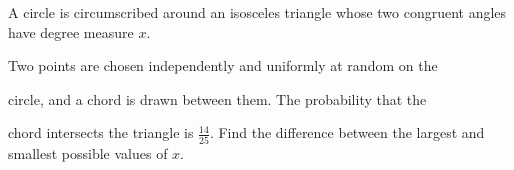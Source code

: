 A circle is circumscribed around an isosceles triangle whose two congruent angles have degree measure $x$.

 Two points are chosen independently and uniformly at random on the 

circle, and a chord is drawn between them. The probability that the 

chord intersects the triangle is $\frac{14}{25}$. Find the difference between the largest and smallest possible values of $x$.